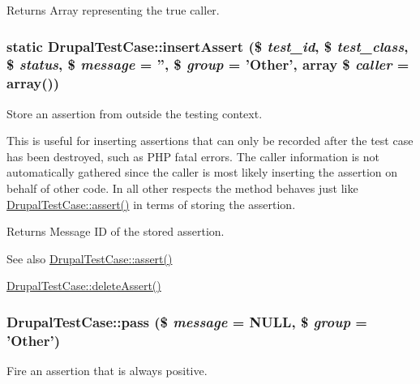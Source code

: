 \begin{DoxyReturn}{Returns}
Array representing the true caller. 
\end{DoxyReturn}
\hypertarget{classDrupalTestCase_add756d567d09f64668d57eb02be5b9fe}{
\subsubsection[{insertAssert}]{\setlength{\rightskip}{0pt plus 5cm}static DrupalTestCase::insertAssert (\$ {\em test\_\-id}, \/  \$ {\em test\_\-class}, \/  \$ {\em status}, \/  \$ {\em message} = {\ttfamily ''}, \/  \$ {\em group} = {\ttfamily 'Other'}, \/  array \$ {\em caller} = {\ttfamily array()})}}
\label{classDrupalTestCase_add756d567d09f64668d57eb02be5b9fe}
Store an assertion from outside the testing context.

This is useful for inserting assertions that can only be recorded after the test case has been destroyed, such as PHP fatal errors. The caller information is not automatically gathered since the caller is most likely inserting the assertion on behalf of other code. In all other respects the method behaves just like \hyperlink{classDrupalTestCase_ae4722b337aa79fcd753a2fc0c2f0b179}{DrupalTestCase::assert()} in terms of storing the assertion.

\begin{DoxyReturn}{Returns}
Message ID of the stored assertion.
\end{DoxyReturn}
\begin{DoxySeeAlso}{See also}
\hyperlink{classDrupalTestCase_ae4722b337aa79fcd753a2fc0c2f0b179}{DrupalTestCase::assert()} 

\hyperlink{classDrupalTestCase_a1a5ada7d27370a7788be5b97d280ebab}{DrupalTestCase::deleteAssert()} 
\end{DoxySeeAlso}
\hypertarget{classDrupalTestCase_a9ced458583ee9de3d82ab1cc09009a01}{
\subsubsection[{pass}]{\setlength{\rightskip}{0pt plus 5cm}DrupalTestCase::pass (\$ {\em message} = {\ttfamily NULL}, \/  \$ {\em group} = {\ttfamily 'Other'})}}
\label{classDrupalTestCase_a9ced458583ee9de3d82ab1cc09009a01}
Fire an assertion that is always positive.


